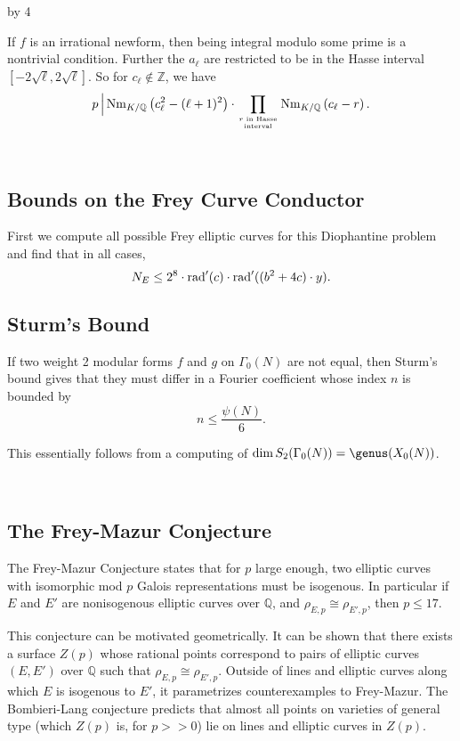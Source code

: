 \documentclass[12pt]{scrartcl}
\def\Q{{\mathbb Q}}
\def\Z{{\mathbb Z}}
\newcommand{\rad}{{\rm{rad}}}
\newcommand{\Nm}{\operatorname{Nm}}
\def\anzspalten{4}
\newlength{\kastenwidth}
\newenvironment{kasten}{%
  \begin{lrbox}{\dummybox}%
    \begin{minipage}{0.96\linewidth}}%
    {\end{minipage}%
  \end{lrbox}%
  \raisebox{-\depth}{\psshadowbox[framesep=1em]{\usebox{\dummybox}}}\\[0.5em]}
\newenvironment{spalte}{%
  \setlength\kastenwidth{1.2\textwidth}
  \divide\kastenwidth by \anzspalten
  \begin{minipage}[t]{\kastenwidth}}{\end{minipage}\hfill}
\begin{document}
\begin{lrbox}{\spalten}
{\begin{spalte}
\begin{kasten}
If $f$ is an irrational newform, then being integral modulo some prime is a nontrivial condition.  Further the $a_\ell$ are restricted to be in the Hasse interval $[-2\sqrt{\ell}, 2\sqrt{\ell}]$.  So for $c_\ell \not\in \Z$, we have
\[ p\, \Big| \Nm_{K/\Q}\left(c_\ell^2 - (\ell+1)^2\right) \cdot \prod_{r \text{ in Hasse} \atop \text{interval}} \Nm_{K/\Q} \left( c_\ell - r \right). \]


\end{kasten}

\begin{kasten}

\subsection*{\color{blue} Bounds on the Frey Curve Conductor}

First we compute all possible Frey elliptic curves for this Diophantine problem and find that in all cases,
\[N_E \leq 2^8 \cdot \rad'(c) \cdot \rad'((b^2+4c)\cdot y).\]


\subsection*{\color{blue} Sturm's Bound}

If two weight 2 modular forms $f$ and $g$ on $\Gamma_0(N)$ are not equal, then Sturm's bound gives that they must differ in a Fourier coefficient whose index $n$ is bounded by 
\[n \leq \frac{\psi(N)}{6}.\] 

This essentially follows from a computing of $\dim S_2(\Gamma_0(N)) = \genus(X_0(N))$.
\end{kasten}

\begin{kasten}

\subsection*{ \color{blue} The Frey-Mazur Conjecture}

The Frey-Mazur Conjecture states that for $p$ large enough, two elliptic curves with isomorphic mod $p$ Galois representations must be isogenous. In particular if $E$ and $E'$ are nonisogenous elliptic curves over $\Q$, and $\rho_{E,p} \cong \rho_{E',p}$, then $p\leq 17$.

This conjecture can be motivated geometrically. It can be shown that there exists a surface $Z(p)$ whose rational points correspond to pairs of elliptic curves $(E,E')$ over $\Q$ such that $\rho_{E,p} \cong \rho_{E',p}$. Outside of lines and elliptic curves along which $E$ is isogenous to $E'$, it parametrizes counterexamples to Frey-Mazur. The Bombieri-Lang conjecture predicts that almost all points on varieties of general type (which $Z(p)$ is, for $p >> 0$) lie on lines and elliptic curves in $Z(p)$.


\end{kasten}
\end{spalte}}
\end{lrbox}
\end{document}
